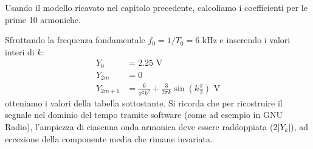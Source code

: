 
Usando il modello ricavato nel capitolo precedente, calcoliamo i coefficienti per le prime 10 armoniche.

Sfruttando la frequenza fondamentale $f_0 = 1/T_0 = 6\text{ kHz}$ e inserendo i valori interi di $k$:
\begin{align*}
    Y_0      & = 2.25 \text{ V}                                                                     \\
    Y_{2m}   & = 0                                                                                  \\
    Y_{2m+1} & = \frac{6}{\pi^2 k^2} + \frac{3}{2 \pi k} \sin\left(k \frac{\pi}{2}\right) \text{ V}
\end{align*}
otteniamo i valori della tabella sottostante.
Si ricorda che per ricostruire il segnale nel dominio del tempo tramite software (come ad esempio in GNU Radio), l'ampiezza di ciascuna onda armonica deve essere raddoppiata ($2|Y_k|$), ad eccezione della componente media che rimane invariata.

